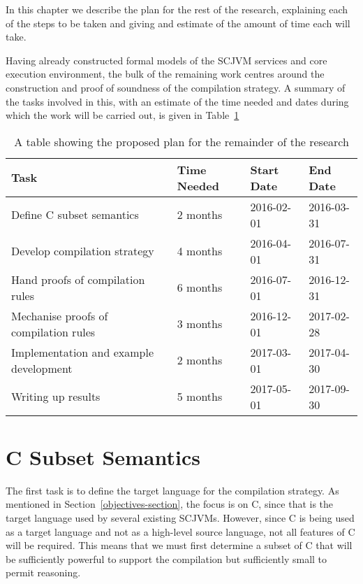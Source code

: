 \documentclass[a4paper,10pt]{report}
\begin{document}
In this chapter we describe the plan for the rest of the research,
explaining each of the steps to be taken and giving and estimate of
the amount of time each will take.

Having already constructed formal models of the SCJVM services and
core execution environment, the bulk of the remaining work centres
around the construction and proof of soundness of the compilation
strategy.
A summary of the tasks involved in this, with an estimate of the time
needed and dates during which the work will be carried out, is given
in Table~\ref{research-plan-table}

\begin{table}[ht]
  \centering
  \begin{tabular}{llll}
    \hline
    Task & Time Needed & Start Date & End Date  \\
    \hline
    Define C subset semantics & 2 months & 2016-02-01 & 2016-03-31 \\
    Develop compilation strategy & 4 months & 2016-04-01 & 2016-07-31 \\
    Hand proofs of compilation rules & 6 months & 2016-07-01 & 2016-12-31 \\
    Mechanise proofs of compilation rules & 3 months & 2016-12-01 & 2017-02-28 \\
    Implementation and example development & 2 months & 2017-03-01 & 2017-04-30 \\
    Writing up results & 5 months & 2017-05-01 & 2017-09-30 \\
    \hline
  \end{tabular}
  \caption{A table showing the proposed plan for the remainder of the research}
  \label{research-plan-table}
\end{table}

\section{C Subset Semantics}

The first task is to define the target language for the compilation
strategy.
As mentioned in Section~\ref{objectives-section}, the focus is on C,
since that is the target language used by several existing SCJVMs.
However, since C is being used as a target language and not as a
high-level source language, not all features of C will be required.
This means that we must first determine a subset of C that will be
sufficiently powerful to support the compilation but sufficiently
small to permit reasoning.
\end{document}

